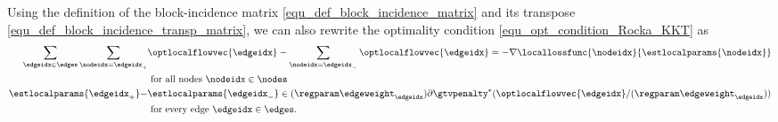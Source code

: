 \documentclass[lettersize,journal]{IEEEtran}
\begin{document}
Using the definition of the block-incidence matrix \eqref{equ_def_block_incidence_matrix} and its 
transpose \eqref{equ_def_block_incidence_transp_matrix}, we can also rewrite the optimality 
condition \eqref{equ_opt_condition_Rocka_KKT} as 
\begin{equation} \label{equ_opt_condition_node_edge}
    \begin{aligned}
        \sum_{\edgeidx \in \edges} 
      	\sum_{\nodeidx = \edgeidx_{+}} &{ \optlocalflowvec{\edgeidx} - \sum_{\nodeidx = \edgeidx_{-}}  \optlocalflowvec{\edgeidx}  = - \nabla \locallossfunc{\nodeidx}{\estlocalparams{\nodeidx}}} \\
       &{\mbox{ for all nodes } \nodeidx \in \nodes} \\ 
       \estlocalparams{\edgeidx_{+}} - &{ \estlocalparams{\edgeidx_{-}}  \in ( \regparam  \edgeweight_{\edgeidx}) \partial \gtvpenalty^{*}( \optlocalflowvec{\edgeidx} /  ( \regparam  \edgeweight_{\edgeidx}) )}  \\
       &{\mbox{ for every edge } \edgeidx \in \edges.}
    \end{aligned}
    \vspace{-2mm}
\end{equation}


\end{document}
